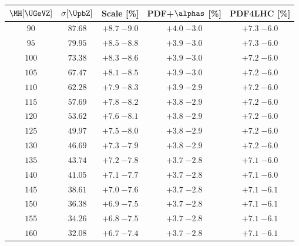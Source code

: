 \begin{table}

   \begin{center}
   \small
   \begin{tabular}{ccccc}
   \hline
   $\MH[\UGeVZ]$ & $\sigma[\UpbZ]$ & Scale [\%] & PDF+$\alphas$ [\%] & \small{PDF4LHC} [\%]\\
   \hline
 $ 90 $&$ 87.68 $& $ {+ 8.7}  \;{- 9.0} $ & $ {+ 4.0}  \;{- 3.0} $ & $ {+ 7.3}  \;{- 6.0} $ \\
 $ 95 $&$ 79.95 $& $ {+ 8.5}  \;{- 8.8} $ & $ {+ 3.9}  \;{- 3.0} $ & $ {+ 7.3}  \;{- 6.0} $ \\
 $100 $&$ 73.38 $& $ {+ 8.3}  \;{- 8.6} $ & $ {+ 3.9}  \;{- 3.0} $ & $ {+ 7.2}  \;{- 6.0} $ \\
 $105 $&$ 67.47 $& $ {+ 8.1}  \;{- 8.5} $ & $ {+ 3.9}  \;{- 3.0} $ & $ {+ 7.2}  \;{- 6.0} $ \\
 $110 $&$ 62.28 $& $ {+ 7.9}  \;{- 8.3} $ & $ {+ 3.9}  \;{- 2.9} $ & $ {+ 7.2}  \;{- 6.0} $ \\
 $115 $&$ 57.69 $& $ {+ 7.8}  \;{- 8.2} $ & $ {+ 3.8}  \;{- 2.9} $ & $ {+ 7.2}  \;{- 6.0} $ \\
 $120 $&$ 53.62 $& $ {+ 7.6}  \;{- 8.1} $ & $ {+ 3.8}  \;{- 2.9} $ & $ {+ 7.2}  \;{- 6.0} $ \\
 $125 $&$ 49.97 $& $ {+ 7.5}  \;{- 8.0} $ & $ {+ 3.8}  \;{- 2.9} $ & $ {+ 7.2}  \;{- 6.0} $ \\
 $130 $&$ 46.69 $& $ {+ 7.3}  \;{- 7.9} $ & $ {+ 3.8}  \;{- 2.9} $ & $ {+ 7.2}  \;{- 6.0} $ \\
 $135 $&$ 43.74 $& $ {+ 7.2}  \;{- 7.8} $ & $ {+ 3.7}  \;{- 2.8} $ & $ {+ 7.1}  \;{- 6.0} $ \\
 $140 $&$ 41.05 $& $ {+ 7.1}  \;{- 7.7} $ & $ {+ 3.7}  \;{- 2.8} $ & $ {+ 7.1}  \;{- 6.0} $ \\
 $145 $&$ 38.61 $& $ {+ 7.0}  \;{- 7.6} $ & $ {+ 3.7}  \;{- 2.8} $ & $ {+ 7.1}  \;{- 6.1} $ \\
 $150 $&$ 36.38 $& $ {+ 6.9}  \;{- 7.5} $ & $ {+ 3.7}  \;{- 2.8} $ & $ {+ 7.1}  \;{- 6.1} $ \\
 $155 $&$ 34.26 $& $ {+ 6.8}  \;{- 7.5} $ & $ {+ 3.7}  \;{- 2.8} $ & $ {+ 7.1}  \;{- 6.1} $ \\
 $160 $&$ 32.08 $& $ {+ 6.7}  \;{- 7.4} $ & $ {+ 3.7}  \;{- 2.8} $ & $ {+ 7.1}  \;{- 6.1} $ \\

\end{tabular}
\end{center}
\end{table}
